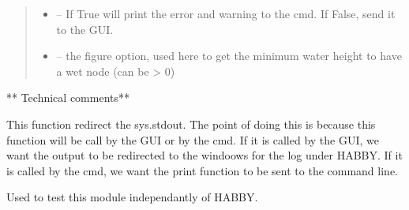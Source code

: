 \documentclass[letterpaper,10pt,english]{sphinxmanual}
\begin{document}
\begin{fulllineitems}
\begin{quote}
\begin{description}
\begin{itemize}
\item {} 
 -- If True will print the error and warning to the cmd. If False, send it to the GUI.

\item {} 
 -- the figure option, used here to get the minimum water height to have a wet node (can be \textgreater{} 0)

\end{itemize}

\end{description}\end{quote}

** Technical comments**

This function redirect the sys.stdout. The point of doing this is because this function will be call by the GUI or
by the cmd. If it is called by the GUI, we want the output to be redirected to the windoows for the log under HABBY.
If it is called by the cmd, we want the print function to be sent to the command line.

\end{fulllineitems}


\begin{fulllineitems}
\label{\detokenize{index:src.hec_ras2D.main}}
Used to test this module independantly of HABBY.

\end{fulllineitems}

\end{document}
